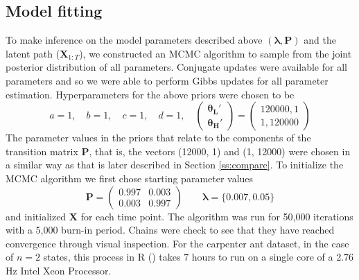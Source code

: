 \documentclass[smallextended]{svjour3}       %
\begin{document}
\subsection{Model fitting}
To make inference on the model parameters described above $( \mathbf{\lambda}, \mathbf{P})$ and the latent path ($\mathbf{X}_{1:T}$), we constructed an MCMC algorithm to sample from the joint posterior distribution of all parameters. Conjugate updates were available for all parameters and so we were able to perform Gibbs updates for all parameter estimation. Hyperparameters for the above priors were chosen to be
 \begin{equation}
 a = 1,\quad
 b = 1,\quad
 c = 1, \quad
 d = 1, \quad
 \begin{pmatrix}
 \bm{\theta_L'}\\
 \bm{\theta_H'}
 \end{pmatrix} = \begin{pmatrix}
 120000, 1 \\
 1, 120000 
 \end{pmatrix}
 \end{equation} 
The parameter values in the priors that relate to the components of the transition matrix $\mathbf{P}$, that is, the vectors (12000, 1) and (1, 12000) were chosen in a similar way as that is later described in Section \ref{ss:compare}. To initialize the MCMC algorithm we first chose starting parameter values
 \begin{equation}
 \bm{P} = \begin{pmatrix}
 0.997 & 0.003 \\
 0.003 & 0.997
 \end{pmatrix}\qquad \bm{\lambda} = \{0.007, 0.05\}
 \end{equation}
 and initialized $\mathbf{X}$ for each time point. The algorithm was run for 50,000 iterations with a 5,000 burn-in period. 
 Chains were check to see that they have reached convergence through visual inspection. For the carpenter ant dataset, in the case of $n = 2$ states, this process in R (\cite{RCoreTeam2016}) takes 7 hours to run on a single core of a 2.76 Hz Intel Xeon Processor. 
\end{document}
